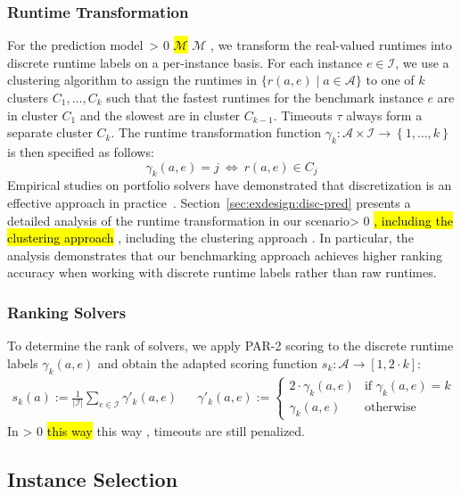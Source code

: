 \documentclass[sn-basic, Numbered]{sn-jnl} %
\newcommand{\showchanges}{1} %
\newcommand{\change}[1]{\ifnum \showchanges > 0 \sethlcolor{yellow}\hl{#1} \else #1 \fi}
\begin{document}
\subsubsection{Runtime Transformation}
\label{sec:main:model:transformation}

For the prediction model~\change{$\mathcal{M}$}, we transform the real-valued runtimes into discrete runtime labels on a per-instance basis.
For each instance $e \in \mathcal{I}$, we use a clustering algorithm to assign the runtimes in $\bigl\{ r(a, e) \mid a \in \mathcal{A} \bigr\}$ to one of $k$ clusters $C_1, \dots, C_k$ such that the fastest runtimes for the benchmark instance $e$ are in cluster $C_1$ and the slowest are in cluster $C_{k-1}$.
Timeouts $\tau$ always form a separate cluster $C_{k}$.
The runtime transformation function $\gamma_k : {\mathcal{A} \times \mathcal{I}} \rightarrow \left\lbrace 1, \dots, k \right\rbrace$ is then specified as follows:
%
$$\gamma_k(a, e) = j ~\Leftrightarrow~ r(a, e) \in C_j$$
%
Empirical studies on portfolio solvers have demonstrated that discretization is an effective approach in practice~\cite{CollauttiMMO13,NgokoCT19}.
Section~\ref{sec:exdesign:disc-pred} presents a detailed analysis of the runtime transformation in our scenario\change{, including the clustering approach}.
In particular, the analysis demonstrates that our benchmarking approach achieves higher ranking accuracy when working with discrete runtime labels rather than raw runtimes.

\subsubsection{Ranking Solvers}
\label{sec:main:model:ranking}

To determine the rank of solvers, we apply PAR-2 scoring to the discrete runtime labels $\gamma_k(a, e)$ and obtain the adapted scoring function $s_k : \mathcal{A} \rightarrow [1, 2 \cdot k]$:
%
\begin{align}
  s_k(a) := \frac{1}{|\mathcal{I}|} \sum_{e \in \mathcal{I}} \gamma'_k(a, e)
  &&
  \gamma'_k(a, e) := \begin{cases}
    2 \cdot \gamma_k(a, e)   & \text{if } \gamma_k(a, e) = k\\
  \gamma_k(a, e)  & \text{otherwise}
  \end{cases}
  \label{eq:rankingeq}
\end{align}
%
In \change{this way}, timeouts are still penalized.

\subsection{Instance Selection}
\label{sec:main:selection}
\end{document}
